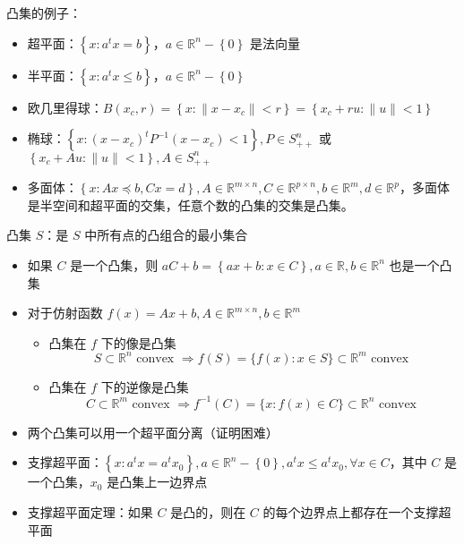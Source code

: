 \begin{remark}
    凸集的例子：
    \begin{itemize}
        \item 超平面：$\left\{x : a^tx = b\right\}$，$a \in \mathbb{R}^n - \left\{0\right\}$ 是法向量
        \item 半平面：$\left\{x : a^tx \le b\right\}$，$a \in \mathbb{R}^n - \left\{0\right\}$
        \item 欧几里得球：$B(x_c, r) = \left\{x: \|x - x_c\| < r\right\} = \left\{x_c + ru: \|u\| < 1\right\}$
        \item 椭球：$\left\{x: (x - x_c)^tP^{-1}(x - x_c) < 1\right\}, P \in S_{++}^n$ 或 $\left\{x_c + Au: \|u\| < 1\right\}, A \in S_{++}^n$
        \item 多面体：$\left\{x : Ax \preceq b, Cx = d\right\}, A \in \mathbb{R}^{m \times n}, C \in \mathbb{R}^{p \times n}, b \in \mathbb{R}^{m}, d \in \mathbb{R}^{p}$，多面体是半空间和超平面的交集，任意个数的凸集的交集是凸集。
    \end{itemize}
\end{remark}

\begin{remark}
    凸集 $S$：是 $S$ 中所有点的凸组合的最小集合
    \begin{itemize}
        \item 如果 $C$ 是一个凸集，则 $aC + b = \left\{ax + b : x \in C\right\}, a \in \mathbb{R}, b \in \mathbb{R}^n$ 也是一个凸集
        \item 对于仿射函数 $f(x) = Ax + b, A \in \mathbb{R}^{m \times n}, b \in \mathbb{R}^m$\begin{itemize}
            \item 凸集在 $f$ 下的像是凸集 \[S \subset \mathbb{R}^{n} \text { convex } \Longrightarrow f(S)=\{f(x): x \in S\} \subset \mathbb{R}^{m} \text { convex }\]
            \item 凸集在 $f$ 下的逆像是凸集 \[C \subset \mathbb{R}^{m} \text { convex } \Longrightarrow f^{-1}(C)=\{x: f(x) \in C\} \subset \mathbb{R}^{n} \text { convex }\]
        \end{itemize}
        \item 两个凸集可以用一个超平面分离（证明困难）
        \item 支撑超平面：$\left\{x: a^tx = a^tx_0\right\}, a \in \mathbb{R}^n - \left\{0\right\}, a^tx \le a^tx_0, \forall x\in C$，其中 $C$ 是一个凸集，$x_0$ 是凸集上一边界点
        \item 支撑超平面定理：如果 $C$ 是凸的，则在 $C$ 的每个边界点上都存在一个支撑超平面
    \end{itemize}
\end{remark}

